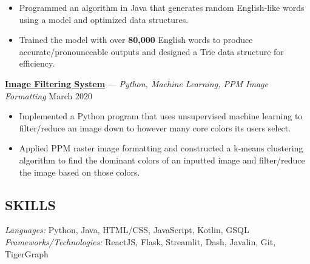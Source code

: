 \documentclass[11pt]{res}
\begin{document}
\begin{footnotesize}
\begin{resume}
\begin{itemize}[leftmargin=6.25mm] \itemsep -2pt 
\item Programmed an algorithm in Java that generates random English-like words using a model and optimized data structures. 
\vspace{1mm}
\item Trained the model with over \textbf{80,000} English words to produce accurate/pronounceable outputs and designed a Trie data structure for efficiency.
\end{itemize}
\vspace{-2.5mm}
\href{https://github.com/CharlesShi12/ImageFilters}{\textbf{Image Filtering System}} — {\sl Python, Machine Learning, PPM Image Formatting} \hfill March 2020\vspace{-5mm}
\begin{itemize}[leftmargin=6.25mm] \itemsep -2pt 
\item Implemented a Python program that uses unsupervised machine learning to filter/reduce an image down to however many core colors its users select.
\vspace{1mm}
\item Applied PPM raster image formatting and constructed a k-means clustering algorithm to find the dominant colors of an inputted image and filter/reduce the image based on those colors. 
\end{itemize}
\begin{small}
\section{SKILLS}
\end{small} 
\vspace{.5mm}
{\sl Languages:} 
Python, Java, HTML/CSS, JavaScript, Kotlin, GSQL \\
{\sl Frameworks/Technologies:} ReactJS, Flask, Streamlit, Dash, Javalin, Git, TigerGraph

\end{resume}
\end{footnotesize}
\end{document}
